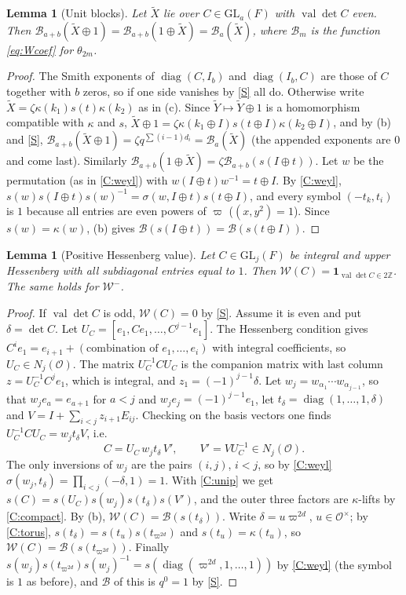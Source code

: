 \documentclass[11pt,oneside,notitlepage]{book}
\numberwithin{equation}{section}
\theoremstyle{plain}
\newtheorem{lemma}[theorem]{Lemma}
\theoremstyle{definition}
\newcommand{\Z}{\mathbb{Z}}
\newcommand{\cO}{\mathcal{O}}
\newcommand{\GL}{\mathrm{GL}}
\newcommand{\cW}{\mathcal{W}}
\newcommand{\cB}{\mathcal{B}}
\newcommand{\val}{\operatorname{val}}
\newcommand{\diag}{\operatorname{diag}}
\newcommand{\one}{\mathbf{1}}
\newcommand{\hil}[2]{(#1,#2)}
\begin{document}
\begin{lemma}[Unit blocks]\label{lem:unitblock}
Let $\tilde X$ lie over $C\in\GL_a(F)$ with $\val\det C$ even. Then $\cB_{a+b}(\tilde X\oplus1)=\cB_{a+b}(1\oplus\tilde X)=\cB_a(\tilde X)$, where $\cB_m$ is the function \eqref{eq:Wcoef} for $\theta_{2m}$.
\end{lemma}
\begin{proof}
The Smith exponents of $\diag(C,I_b)$ and $\diag(I_b,C)$ are those of $C$ together with $b$ zeros, so if one side vanishes by \ref{S} all do. Otherwise write $\tilde X=\zeta\kappa(k_1)s(t)\kappa(k_2)$ as in (c). Since $\tilde Y\mapsto\tilde Y\oplus1$ is a homomorphism compatible with $\kappa$ and $s$, $\tilde X\oplus1=\zeta\kappa(k_1\oplus I)s(t\oplus I)\kappa(k_2\oplus I)$, and by (b) and \ref{S}, $\cB_{a+b}(\tilde X\oplus1)=\zeta q^{\sum(i-1)d_i}=\cB_a(\tilde X)$ (the appended exponents are $0$ and come last). Similarly $\cB_{a+b}(1\oplus\tilde X)=\zeta\cB_{a+b}(s(I\oplus t))$. Let $w$ be the permutation (as in \ref{C:weyl}) with $w(I\oplus t)w^{-1}=t\oplus I$. By \ref{C:weyl}, $s(w)s(I\oplus t)s(w)^{-1}=\sigma(w,I\oplus t)s(t\oplus I)$, and every symbol $\hil{-t_k}{t_i}$ is $1$ because all entries are even powers of $\varpi$ ($\hil{x}{y^2}=1$). Since $s(w)=\kappa(w)$, (b) gives $\cB(s(I\oplus t))=\cB(s(t\oplus I))$.
\end{proof}

\begin{lemma}[Positive Hessenberg value]\label{lem:hessenberg}
Let $C\in\GL_j(F)$ be integral and upper Hessenberg with all subdiagonal entries equal to $1$. Then $\cW(C)=\one_{\val\det C\in2\Z}$. The same holds for $\cW^-$.
\end{lemma}
\begin{proof}
If $\val\det C$ is odd, $\cW(C)=0$ by \ref{S}. Assume it is even and put $\delta=\det C$. Let $U_C=[e_1,Ce_1,\dots,C^{j-1}e_1]$. The Hessenberg condition gives $C^ie_1=e_{i+1}+(\text{combination of }e_1,\dots,e_i)$ with integral coefficients, so $U_C\in N_j(\cO)$. The matrix $U_C^{-1}CU_C$ is the companion matrix with last column $z=U_C^{-1}C^je_1$, which is integral, and $z_1=(-1)^{j-1}\delta$. Let $w_j=w_{\alpha_1}\cdots w_{\alpha_{j-1}}$, so that $w_je_a=e_{a+1}$ for $a<j$ and $w_je_j=(-1)^{j-1}e_1$, let $t_\delta=\diag(1,\dots,1,\delta)$ and $V=I+\sum_{i<j}z_{i+1}E_{ij}$. Checking on the basis vectors one finds $U_C^{-1}CU_C=w_jt_\delta V$, i.e.\
\[C=U_C\,w_jt_\delta\,V',\qquad V'=VU_C^{-1}\in N_j(\cO).\]
The only inversions of $w_j$ are the pairs $(i,j)$, $i<j$, so by \ref{C:weyl} $\sigma(w_j,t_\delta)=\prod_{i<j}\hil{-\delta}{1}=1$. With \ref{C:unip} we get $s(C)=s(U_C)s(w_j)s(t_\delta)s(V')$, and the outer three factors are $\kappa$-lifts by \ref{C:compact}. By (b), $\cW(C)=\cB(s(t_\delta))$. Write $\delta=u\varpi^{2d}$, $u\in\cO^\times$; by \ref{C:torus}, $s(t_\delta)=s(t_u)s(t_{\varpi^{2d}})$ and $s(t_u)=\kappa(t_u)$, so $\cW(C)=\cB(s(t_{\varpi^{2d}}))$. Finally $s(w_j)s(t_{\varpi^{2d}})s(w_j)^{-1}=s(\diag(\varpi^{2d},1,\dots,1))$ by \ref{C:weyl} (the symbol is $1$ as before), and $\cB$ of this is $q^0=1$ by \ref{S}.
\end{proof}
\end{document}
